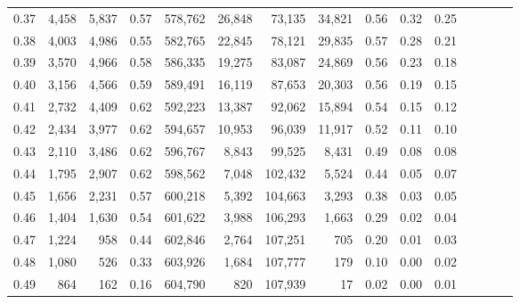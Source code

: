 \begin{tabular}{rrrcrrrrrrrrrrr}
0.37 &   4,458 &  5,837 &                                       0.57 &  578,762 &   26,848 &   73,135 &   34,821 &  0.56 &  0.32 &                         0.25 \\
0.38 &   4,003 &  4,986 &                                       0.55 &  582,765 &   22,845 &   78,121 &   29,835 &  0.57 &  0.28 &                         0.21 \\
0.39 &   3,570 &  4,966 &                                       0.58 &  586,335 &   19,275 &   83,087 &   24,869 &  0.56 &  0.23 &                         0.18 \\
0.40 &   3,156 &  4,566 &                                       0.59 &  589,491 &   16,119 &   87,653 &   20,303 &  0.56 &  0.19 &                         0.15 \\
0.41 &   2,732 &  4,409 &                                       0.62 &  592,223 &   13,387 &   92,062 &   15,894 &  0.54 &  0.15 &                         0.12 \\
0.42 &   2,434 &  3,977 &                                       0.62 &  594,657 &   10,953 &   96,039 &   11,917 &  0.52 &  0.11 &                         0.10 \\
0.43 &   2,110 &  3,486 &                                       0.62 &  596,767 &    8,843 &   99,525 &    8,431 &  0.49 &  0.08 &                         0.08 \\
0.44 &   1,795 &  2,907 &                                       0.62 &  598,562 &    7,048 &  102,432 &    5,524 &  0.44 &  0.05 &                         0.07 \\
0.45 &   1,656 &  2,231 &                                       0.57 &  600,218 &    5,392 &  104,663 &    3,293 &  0.38 &  0.03 &                         0.05 \\
0.46 &   1,404 &  1,630 &                                       0.54 &  601,622 &    3,988 &  106,293 &    1,663 &  0.29 &  0.02 &                         0.04 \\
0.47 &   1,224 &    958 &                                       0.44 &  602,846 &    2,764 &  107,251 &      705 &  0.20 &  0.01 &                         0.03 \\
0.48 &   1,080 &    526 &                                       0.33 &  603,926 &    1,684 &  107,777 &      179 &  0.10 &  0.00 &                         0.02 \\
0.49 &     864 &    162 &                                       0.16 &  604,790 &      820 &  107,939 &       17 &  0.02 &  0.00 &                         0.01 \\

\end{tabular}
